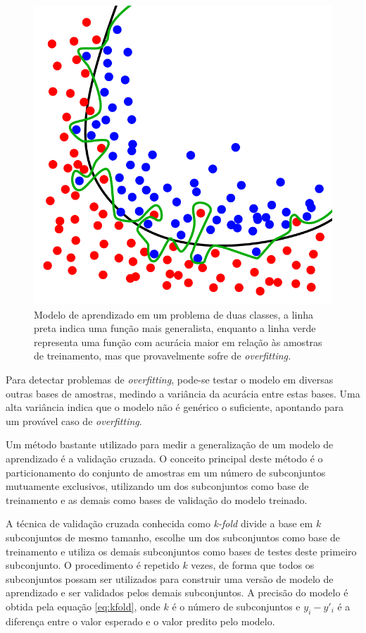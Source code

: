 \begin{figure}[h!]
  \centering
  \includegraphics[scale=0.4]{imgs/overfitting}
  \caption{Modelo de aprendizado em um problema de duas classes, a linha preta indica uma função mais generalista, enquanto a linha verde representa uma função com acurácia maior em relação às amostras de treinamento, mas que provavelmente sofre de \textit{overfitting.}}
  \label{fig:overfitting}
\end{figure}

Para detectar problemas de \textit{overfitting}, pode-se testar o modelo em diversas outras bases de amostras, medindo a variância da acurácia entre estas bases. Uma alta variância indica que o modelo não é genérico o suficiente, apontando para um provável caso de \textit{overfitting}.

Um método bastante utilizado para medir a generalização de um modelo de aprendizado é a validação cruzada. O conceito principal deste método é o particionamento do conjunto de amostras em um número de subconjuntos mutuamente exclusivos, utilizando um dos subconjuntos como base de treinamento e as demais como bases de validação do modelo treinado.

A técnica de validação cruzada conhecida como \textit{k-fold} divide a base em $k$ subconjuntos de mesmo tamanho, escolhe um dos subconjuntos como base de treinamento e utiliza os demais subconjuntos como bases de testes deste primeiro subconjunto. O procedimento é repetido $k$ vezes, de forma que todos os subconjuntos possam ser utilizados para construir uma versão de modelo de aprendizado e ser validados pelos demais subconjuntos. A precisão do modelo é obtida pela equação \ref{eq:kfold}, onde $k$ é o número de subconjuntos e $y_i - y'_i$ é a diferença entre o valor esperado e o valor predito pelo modelo.

